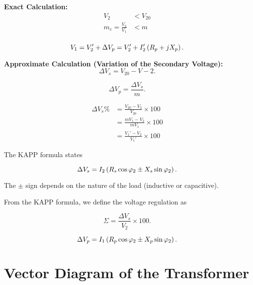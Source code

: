\documentclass{report}
\begin{document}
\begin{enumerate}
	\ii \textbf{Exact Calculation:}
	\begin{align*}
		V_2                   & < V_{20} \\
		m_c = \frac{V_2}{V_1} & < m      \\
	\end{align*}

	\[
		V_1 = V_2' + \Delta V_p = V_2' + I_2'\left( R_p + j X_p \right)
		.\]

	\ii \textbf{Approximate Calculation (Variation of the Secondary Voltage):}
	\[
		\Delta V_s = V_20 - V-2
		.\]

	\[
		\Delta V_p = \frac{\Delta V_s}{m}
		.\]

	\begin{align*}
		\Delta V_s \% & = \frac{V_{20} - V_2}{V_{20}} \times 100 \\
		              & = \frac{mV_1 - V_2}{mV_1} \times 100     \\
		              & = \frac{V_1' - V_2}{V_1'} \times 100
	\end{align*}

	The KAPP formula states

	\[
		\Delta V_s = I_2 \left( R_s \cos \varphi_2 \pm X_s \sin \varphi_2 \right)
		.\]

	The $\pm$ sign depends on the nature of the load (inductive or capacitive).

	From the KAPP formula, we define the voltage regulation as

	\[
		\Sigma = \frac{\Delta V_s}{V_2} \times 100
		.\]

	\[
		\Delta V_p = I_1 \left( R_p \cos \varphi_2 \pm X_p \sin \varphi_2 \right)
		.\]
\end{enumerate}

\section{Vector Diagram of the Transformer}
\end{document}
